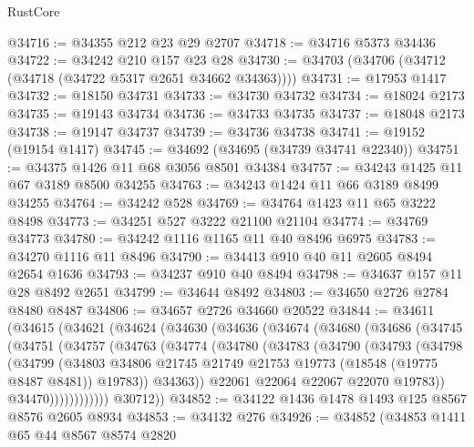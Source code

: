 \begin{lexlean}{RustCore}
\begin{coremodule}
@34716 := @34355 @212 @23 @29 @2707
@34718 := @34716 @5373 @34436
@34722 := @34242 @210 @157 @23 @28
@34730 := @34703 (@34706 (@34712 (@34718 (@34722 @5317 @2651 @34662 @34363))))
@34731 := @17953 @1417
@34732 := @18150 @34731
@34733 := @34730 @34732
@34734 := @18024 @2173
@34735 := @19143 @34734
@34736 := @34733 @34735
@34737 := @18048 @2173
@34738 := @19147 @34737
@34739 := @34736 @34738
@34741 := @19152 (@19154 @1417)
@34745 := @34692 (@34695 (@34739 @34741 @22340))
@34751 := @34375 @1426 @11 @68 @3056 @8501 @34384
@34757 := @34243 @1425 @11 @67 @3189 @8500 @34255
@34763 := @34243 @1424 @11 @66 @3189 @8499 @34255
@34764 := @34242 @528
@34769 := @34764 @1423 @11 @65 @3222 @8498
@34773 := @34251 @527 @3222 @21100 @21104
@34774 := @34769 @34773
@34780 := @34242 @1116 @1165 @11 @40 @8496 @6975
@34783 := @34270 @1116 @11 @8496
@34790 := @34413 @910 @40 @11 @2605 @8494 @2654 @1636
@34793 := @34237 @910 @40 @8494
@34798 := @34637 @157 @11 @28 @8492 @2651
@34799 := @34644 @8492
@34803 := @34650 @2726 @2784 @8480 @8487
@34806 := @34657 @2726 @34660 @20522
@34844 := @34611
    (@34615
      (@34621
        (@34624
          (@34630
            (@34636
              (@34674
                (@34680
                  (@34686
                    (@34745
                      (@34751
                        (@34757
                          (@34763
                            (@34774
                              (@34780
                                (@34783
                                  (@34790
                                    (@34793
                                      (@34798
                                        (@34799
                                          (@34803
                                            @34806
                                            @21745
                                            @21749
                                            @21753
                                            @19773
                                            (@18548 (@19775 @8487 @8481))
                                            @19783))
                                        @34363))
                                    @22061
                                    @22064
                                    @22067
                                    @22070
                                    @19783))
                                @34470))))))))))))
        @30712))
@34852 := @34122 @1436 @1478 @1493 @125 @8567 @8576 @2605 @8934
@34853 := @34132 @276
@34926 := @34852
    (@34853
      @1411
      @65
      @44
      @8567
      @8574
      @2820

\end{coremodule}
\end{lexlean}
